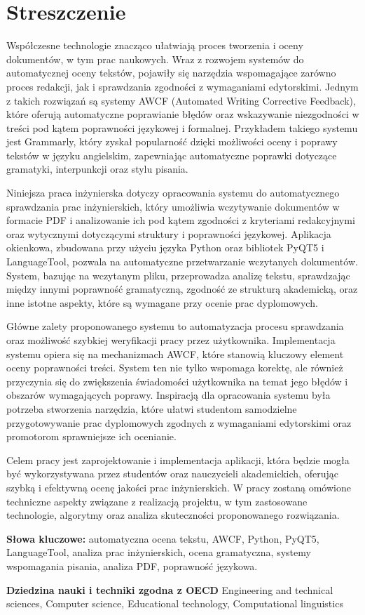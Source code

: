 \chapter*{Streszczenie}


\justifying

Współczesne technologie znacząco ułatwiają proces tworzenia i oceny dokumentów, w tym prac naukowych. Wraz z rozwojem systemów do automatycznej oceny tekstów, pojawiły się narzędzia wspomagające zarówno proces redakcji, jak i sprawdzania zgodności z wymaganiami edytorskimi. Jednym z takich rozwiązań są systemy AWCF (Automated Writing Corrective Feedback), które oferują automatyczne poprawianie błędów oraz wskazywanie niezgodności w treści pod kątem poprawności językowej i formalnej. Przykładem takiego systemu jest Grammarly, który zyskał popularność dzięki możliwości oceny i poprawy tekstów w języku angielskim, zapewniając automatyczne poprawki dotyczące gramatyki, interpunkcji oraz stylu pisania.

Niniejsza praca inżynierska dotyczy opracowania systemu do automatycznego sprawdzania prac inżynierskich, który umożliwia wczytywanie dokumentów w formacie PDF i analizowanie ich pod kątem zgodności z kryteriami redakcyjnymi oraz wytycznymi dotyczącymi struktury i poprawności językowej. Aplikacja okienkowa, zbudowana przy użyciu języka Python oraz bibliotek PyQT5 i LanguageTool, pozwala na automatyczne przetwarzanie wczytanych dokumentów. System, bazując na wczytanym pliku, przeprowadza analizę tekstu, sprawdzając między innymi poprawność gramatyczną, zgodność ze strukturą akademicką, oraz inne istotne aspekty, które są wymagane przy ocenie prac dyplomowych.

Główne zalety proponowanego systemu to automatyzacja procesu sprawdzania oraz możliwość szybkiej weryfikacji pracy przez użytkownika. Implementacja systemu opiera się na mechanizmach AWCF, które stanowią kluczowy element oceny poprawności treści. System ten nie tylko wspomaga korektę, ale również przyczynia się do zwiększenia świadomości użytkownika na temat jego błędów i obszarów wymagających poprawy. Inspiracją dla opracowania systemu była potrzeba stworzenia narzędzia, które ułatwi studentom samodzielne przygotowywanie prac dyplomowych zgodnych z wymaganiami edytorskimi oraz promotorom sprawniejsze ich ocenianie.

Celem pracy jest zaprojektowanie i implementacja aplikacji, która będzie mogła być wykorzystywana przez studentów oraz nauczycieli akademickich, oferując szybką i efektywną ocenę jakości prac inżynierskich. W pracy zostaną omówione techniczne aspekty związane z realizacją projektu, w tym zastosowane technologie, algorytmy oraz analiza skuteczności proponowanego rozwiązania.

\bigskip

\noindent\textbf{Słowa kluczowe:} automatyczna ocena tekstu, AWCF, Python, PyQT5, LanguageTool, analiza prac inżynierskich, ocena gramatyczna, systemy wspomagania pisania, analiza PDF, poprawność językowa.

\bigskip

\noindent\textbf{Dziedzina nauki i techniki zgodna z OECD} Engineering and technical sciences, Computer science, Educational technology, Computational linguistics